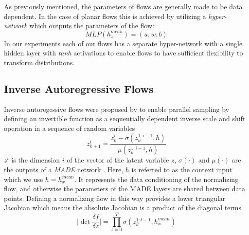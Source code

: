 

As previously mentioned, the parameters of flows are generally made to be data dependent. In the case of planar flows this is achieved by utilizing a \textit{hyper-network} \cite{ha2016hypernets} which outputs the parameters of the flow:
 \begin{equation}
 MLP(h^{mean}_{x}) = (u, w, b)
 \end{equation}
In our experiments each of our flows has a separate hyper-network with a single hidden layer with \textit{tanh} activations to enable flows to have sufficient flexibility to transform distributions.
 
\subsection{Inverse Autoregressive Flows}
Inverse autoregessive flows were proposed by \citet{kingma2016IAF} to enable parallel sampling by defining an invertible function as a sequentially dependent  inverse scale and shift  operation in a sequence of random variables
\begin{equation}
z_{k+1}^{i} = \frac{z_{k}^{i} - \sigma(z_{k}^{1:i-1}, h)}{\mu(z_{k}^{1:i-1}, h)}
\end{equation}
$z^{i}$ is the dimension $i$ of the vector of the latent variable $z$, $\sigma(\cdot)$ and $\mu(\cdot)$ are the outputs of a \textit{MADE} network \cite{MADE2015germain}. Here, $h$ is referred to as the context input which we use $h= h^{mean}_{x}$. It represents the data conditioning of the normalizing flow, and otherwise the parameters of the MADE layers are shared between data points. Defining a normalizing flow in this way provides a lower triangular Jacobian which means the absolute Jacobian is a product of the diagonal terms 
\begin{equation}
\bigg| \det \frac{\delta f}{\delta z} \bigg| = \prod_{t=0}^{T} \sigma(z_{k}^{1:t-1}, h^{mean}_{x})
\end{equation}

